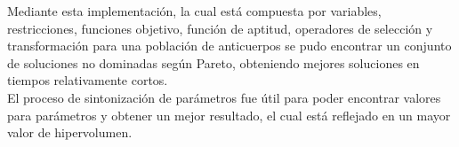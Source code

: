 Mediante esta implementación, la cual está compuesta por variables, restricciones, funciones objetivo, función de aptitud, operadores de selección y transformación para una población de anticuerpos se pudo encontrar un conjunto de soluciones no dominadas según Pareto, obteniendo mejores soluciones en tiempos relativamente cortos. \\

El proceso de sintonización de parámetros fue útil para poder encontrar valores para parámetros y obtener un mejor resultado, el cual está reflejado en un mayor valor de hipervolumen.\\
